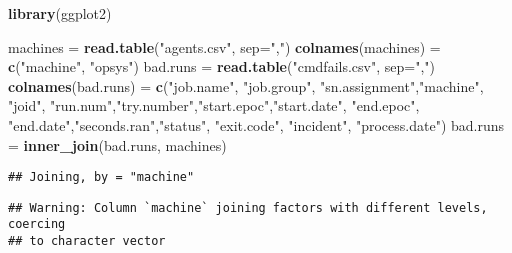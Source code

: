 \documentclass[]{article}
\newenvironment{Shaded}{\begin{snugshade}}{\end{snugshade}}
\newcommand{\KeywordTok}[1]{\textcolor[rgb]{0.13,0.29,0.53}{\textbf{#1}}}
\newcommand{\DataTypeTok}[1]{\textcolor[rgb]{0.13,0.29,0.53}{#1}}
\newcommand{\StringTok}[1]{\textcolor[rgb]{0.31,0.60,0.02}{#1}}
\newcommand{\NormalTok}[1]{#1}
\begin{document}
\begin{Shaded}
\begin{Highlighting}[]
\KeywordTok{library}\NormalTok{(ggplot2)}

\NormalTok{machines =}\StringTok{ }\KeywordTok{read.table}\NormalTok{(}\StringTok{"agents.csv"}\NormalTok{, }\DataTypeTok{sep=}\StringTok{","}\NormalTok{)}
\KeywordTok{colnames}\NormalTok{(machines) =}\StringTok{ }\KeywordTok{c}\NormalTok{(}\StringTok{"machine"}\NormalTok{, }\StringTok{"opsys"}\NormalTok{)}
\NormalTok{bad.runs =}\StringTok{ }\KeywordTok{read.table}\NormalTok{(}\StringTok{"cmdfails.csv"}\NormalTok{, }\DataTypeTok{sep=}\StringTok{","}\NormalTok{)}
\KeywordTok{colnames}\NormalTok{(bad.runs) =}\StringTok{ }
\StringTok{  }\KeywordTok{c}\NormalTok{(}\StringTok{"job.name"}\NormalTok{, }\StringTok{"job.group"}\NormalTok{, }\StringTok{"sn.assignment"}\NormalTok{,}\StringTok{"machine"}\NormalTok{, }\StringTok{"joid"}\NormalTok{,}
    \StringTok{"run.num"}\NormalTok{,}\StringTok{"try.number"}\NormalTok{,}\StringTok{"start.epoc"}\NormalTok{,}\StringTok{"start.date"}\NormalTok{, }\StringTok{"end.epoc"}\NormalTok{,}
    \StringTok{"end.date"}\NormalTok{,}\StringTok{"seconds.ran"}\NormalTok{,}\StringTok{"status"}\NormalTok{, }\StringTok{"exit.code"}\NormalTok{, }\StringTok{"incident"}\NormalTok{,}
    \StringTok{"process.date"}\NormalTok{)}
\NormalTok{bad.runs =}\StringTok{ }\KeywordTok{inner_join}\NormalTok{(bad.runs, machines)}
\end{Highlighting}
\end{Shaded}

\begin{verbatim}
## Joining, by = "machine"
\end{verbatim}

\begin{verbatim}
## Warning: Column `machine` joining factors with different levels, coercing
## to character vector
\end{verbatim}
\end{document}
